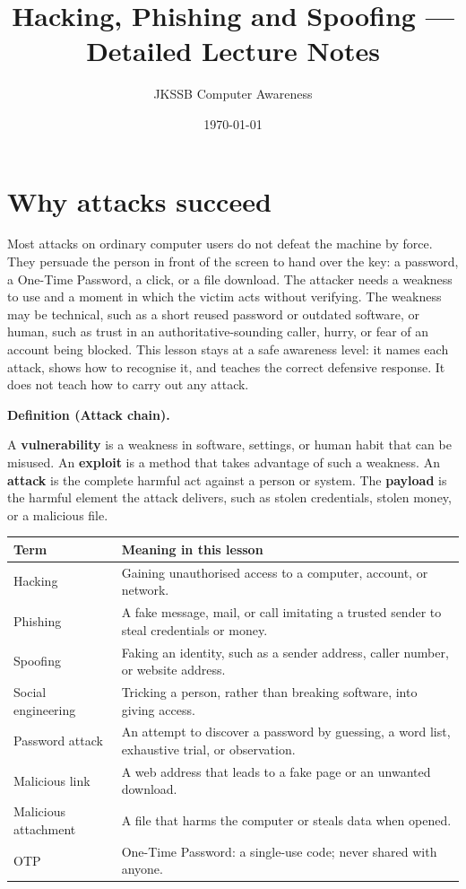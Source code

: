 \documentclass[11pt]{article}
\title{Hacking, Phishing and Spoofing --- Detailed Lecture Notes}
\author{JKSSB Computer Awareness}
\date{\today}
\newenvironment{definitionbox}[1]{%
  \par\noindent\textbf{Definition (#1).}\ \itshape
}{\par\vspace{0.3em}}
\begin{document}
\maketitle

\section{Why attacks succeed}
Most attacks on ordinary computer users do not defeat the machine by
force. They persuade the person in front of the screen to hand over the
key: a password, a One-Time Password, a click, or a file download. The
attacker needs a weakness to use and a moment in which the victim acts
without verifying. The weakness may be technical, such as a short reused
password or outdated software, or human, such as trust in an
authoritative-sounding caller, hurry, or fear of an account being
blocked. This lesson stays at a safe awareness level: it names each
attack, shows how to recognise it, and teaches the correct defensive
response. It does not teach how to carry out any attack.

\begin{definitionbox}{Attack chain}
A \textbf{vulnerability} is a weakness in software, settings, or human
habit that can be misused. An \textbf{exploit} is a method that takes
advantage of such a weakness. An \textbf{attack} is the complete harmful
act against a person or system. The \textbf{payload} is the harmful
element the attack delivers, such as stolen credentials, stolen money,
or a malicious file.
\end{definitionbox}

\begin{center}
\begin{tabular}{p{}p{}}
\toprule
\textbf{Term} & \textbf{Meaning in this lesson} \\
\midrule
Hacking & Gaining unauthorised access to a computer, account, or network. \\
Phishing & A fake message, mail, or call imitating a trusted sender to steal credentials or money. \\
Spoofing & Faking an identity, such as a sender address, caller number, or website address. \\
Social engineering & Tricking a person, rather than breaking software, into giving access. \\
Password attack & An attempt to discover a password by guessing, a word list, exhaustive trial, or observation. \\
Malicious link & A web address that leads to a fake page or an unwanted download. \\
Malicious attachment & A file that harms the computer or steals data when opened. \\
OTP & One-Time Password: a single-use code; never shared with anyone. \\
\bottomrule
\end{tabular}
\end{center}
\end{document}
